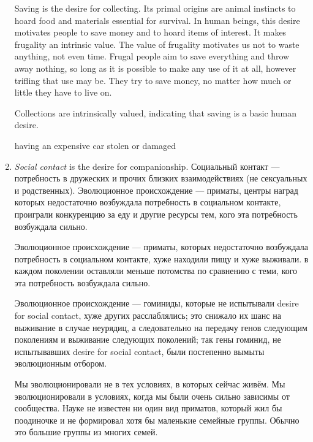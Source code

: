 \documentclass[11pt]{article}
\theoremstyle{remark}
\theoremstyle{definition}
\begin{document}
\begin{enumerate}
Saving is the desire for collecting. Its primal origins are animal instincts to hoard food and materials essential for survival. In human beings, this desire motivates people to save money and to hoard items of interest. It makes frugality an intrinsic value. The value of frugality motivates us not to waste anything, not even time. Frugal people aim to save everything and throw away nothing, so long as it is possible to make any use of it at all, however trifling that use may be. They try to save money, no matter how much or little they have to live on.

Collections are intrinsically valued, indicating that saving is a basic human desire.

having an expensive car stolen or damaged




\item \textit{Social contact} is the desire for companionship. Социальный контакт --- потребность в дружеских и прочих близких взаимодействиях (не сексуальных и родственных). Эволюционное происхождение --- приматы, центры наград которых недостаточно возбуждала потребность в социальном контакте, проиграли конкуренцию за еду и другие ресурсы тем, кого эта потребность возбуждала сильно.

Эволюционное происхождение --- приматы, которых недостаточно возбуждала потребность в социальном контакте, хуже находили пищу и хуже выживали. в каждом поколении оставляли меньше потомства по сравнению с теми, кого эта потребность возбуждала сильно.

Эволюционное происхождение --- гоминиды, которые не испытывали desire for social contact, хуже других расслаблялись; это снижало их шанс на выживание в случае неурядиц, а следовательно на передачу генов следующим поколениям и выживание следующих поколений; так гены гоминид, не испытывавших desire for social contact, были постепенно вымыты эволюционным отбором. 


Мы эволюционировали не в тех условиях, в которых сейчас живём. Мы эволюционировали в условиях, когда мы были очень сильно зависимы от сообщества. Науке не известен ни один вид приматов, который жил бы поодиночке и не формировал хотя бы маленькие семейные группы. Обычно это большие группы из многих семей. 



\end{enumerate}
\end{document}
